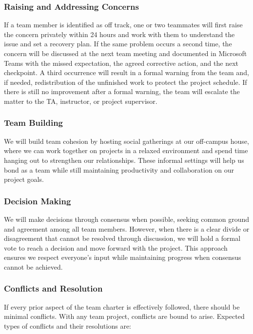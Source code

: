 \documentclass{article}
\begin{document}
\subsubsection*{Raising and Addressing Concerns} \label{sec:raising_concerns}

If a team member is identified as off track, one or two teammates will first
raise the concern privately within 24 hours and work with them to understand
the issue and set a recovery plan. If the same problem occurs a second time,
the concern will be discussed at the next team meeting and documented in
Microsoft Teams with the missed expectation, the agreed corrective action, and
the next checkpoint. A third occurrence will result in a formal warning from
the team and, if needed, redistribution of the unfinished work to protect the
project schedule. If there is still no improvement after a formal warning, the
team will escalate the matter to the TA, instructor, or project supervisor.

\subsubsection*{Team Building}

We will build team cohesion by hosting social gatherings at our off-campus
house, where we can work together on projects in a relaxed environment and spend
time hanging out to strengthen our relationships. These informal settings will
help us bond as a team while still maintaining productivity and collaboration on
our project goals.

\subsubsection*{Decision Making} 

We will make decisions through consensus when possible, seeking common ground
and agreement among all team members. However, when there is a clear divide or
disagreement that cannot be resolved through discussion, we will hold a formal
vote to reach a decision and move forward with the project. This approach
ensures we respect everyone's input while maintaining progress when consensus
cannot be achieved.

\subsubsection*{Conflicts and Resolution}
If every prior aspect of the team charter is effectively followed,
there should be minimal conflicts. With any team project, conflicts
are bound to arise. Expected types of conflicts and their resolutions are:
\end{document}
